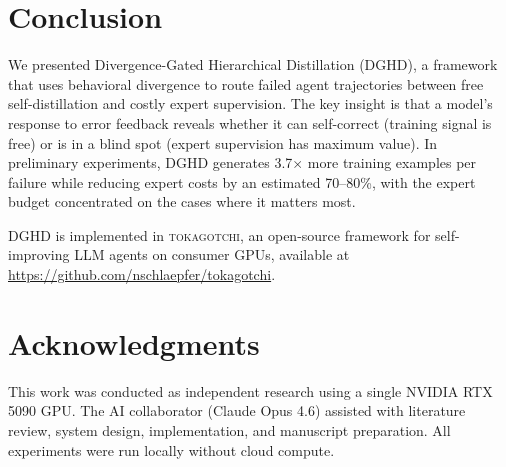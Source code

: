 \documentclass[11pt]{article}
\newcommand{\ours}{DGHD}
\newcommand{\ourslong}{Divergence-Gated Hierarchical Distillation}
\begin{document}
\section{Conclusion}
\label{sec:conclusion}

We presented \ourslong{} (\ours{}), a framework that uses behavioral divergence to route failed agent trajectories between free self-distillation and costly expert supervision. The key insight is that a model's response to error feedback reveals whether it can self-correct (training signal is free) or is in a blind spot (expert supervision has maximum value). In preliminary experiments, \ours{} generates 3.7$\times$ more training examples per failure while reducing expert costs by an estimated 70--80\%, with the expert budget concentrated on the cases where it matters most.

\ours{} is implemented in \textsc{tokagotchi}, an open-source framework for self-improving LLM agents on consumer GPUs, available at \url{https://github.com/nschlaepfer/tokagotchi}.

\section*{Acknowledgments}

This work was conducted as independent research using a single NVIDIA RTX 5090 GPU. The AI collaborator (Claude Opus 4.6) assisted with literature review, system design, implementation, and manuscript preparation. All experiments were run locally without cloud compute.


\end{document}
